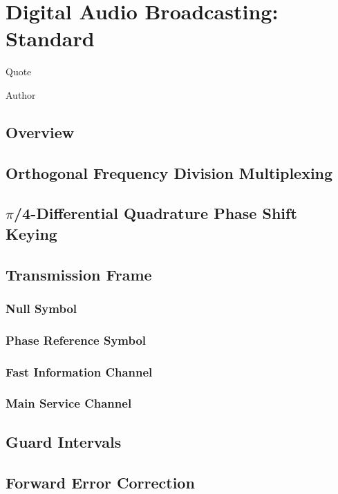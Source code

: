 \documentclass[class=report,11pt,crop=false]{standalone}
\begin{document}
\chapter{Digital Audio Broadcasting: Standard}
\epigraph{Quote}%
{Author}

\section{Overview}
\blindtext

\section{Orthogonal Frequency Division Multiplexing}
\blindtext

\section{\texorpdfstring{$\pi$}//4-Differential Quadrature Phase Shift Keying}
\blindtext

\section{Transmission Frame}
\blindtext

\subsection{Null Symbol}
\blindtext

\subsection{Phase Reference Symbol}
\blindtext

\subsection{Fast Information Channel}
\blindtext

\subsection{Main Service Channel}
\blindtext

\section{Guard Intervals}
\blindtext

\section{Forward Error Correction}
\blindtext

\ifstandalone

\fi
\end{document}
